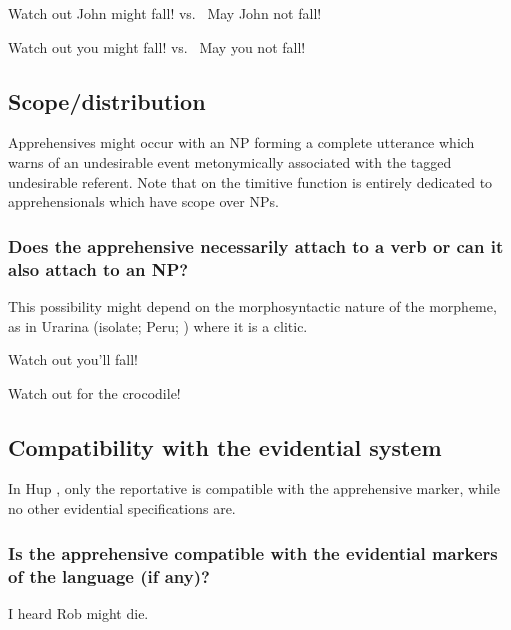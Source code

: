 \documentclass[output=paper,colorlinks,citecolor=brown]{langscibook}
\begin{document}
\ea \label{p37} {\op}Watch out{\cp} John might fall! \hspace{0.9cm} vs.\ \hspace{1cm} May John not fall!
\z

\ea \label{p38} {\op}Watch out{\cp} you might fall! \hspace{1cm} vs.\ \hspace{1cm} May you not fall!
\z



\subsection{Scope/distribution}
\label{subsec:apprscope}

Apprehensives might occur with an NP forming a complete utterance which warns of an undesirable event metonymically associated with the tagged undesirable referent. Note that  on the timitive function is entirely dedicated to apprehensionals which have scope over NPs.

\subsubsection{Does the apprehensive necessarily attach to a verb or can it also attach to an NP?}
This possibility might depend on the morphosyntactic nature of the morpheme, as in Urarina (isolate; Peru; \cite{Olawsky2006}) where it is a clitic.
\label{1.10.1}

\ea \label{p39} {\op}Watch out{\cp} you'll fall!
\z

\ea \label{p40} {\op}Watch out for{\cp} the crocodile!
\z


\subsection{Compatibility with the evidential system}
\label{subsec:apprevidential}

In Hup \citep[632]{epps2008}, only the reportative is compatible with the apprehensive marker, while no other evidential specifications are.

\subsubsection{Is the apprehensive compatible with the evidential markers of the language (if any)?}
\label{1.11.1}

\ea \label{p41} {\op}I heard{\cp} Rob might die.
\z
\end{document}
